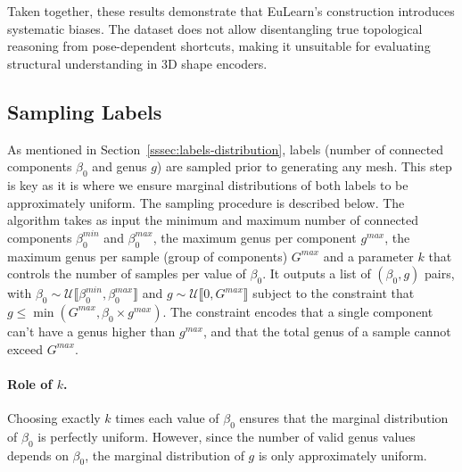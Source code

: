 Taken together, these results demonstrate that EuLearn’s construction introduces systematic biases. The dataset does not allow disentangling true topological reasoning from pose-dependent shortcuts, making it unsuitable for evaluating structural understanding in 3D shape encoders.

\subsection{Sampling Labels}
\label{ssec:suppl_sampling_labels}

As mentioned in Section~\ref{sssec:labels-distribution}, labels (number of connected components $\beta_0$ and genus $g$) are sampled prior to generating any mesh. This step is key as it is where we ensure marginal distributions of both labels to be approximately uniform. The sampling procedure is described below. The algorithm takes as input the minimum and maximum number of connected components $\beta_0^{min}$ and $\beta_0^{max}$, the maximum genus per component $g^{max}$, the maximum genus per sample (group of components) $G^{max}$ and a parameter $k$ that controls the number of samples per value of $\beta_0$. It outputs a list of $(\beta_0, g)$ pairs, with $\beta_0\sim\mathcal{U}\llbracket \beta_0^{min}, \beta_0^{max} \rrbracket$ and $g\sim\mathcal{U}\llbracket 0, G^{max} \rrbracket$ subject to the constraint that $g \leq \min(G^{max}, \beta_0 \times g^{max})$. The constraint encodes that a single component can't have a genus higher than $g^{max}$, and that the total genus of a sample cannot exceed $G^{max}$. 

\paragraph{Role of $k$.} 
Choosing exactly $k$ times each value of $\beta_0$ ensures that the marginal distribution of $\beta_0$ is perfectly uniform. However, since the number of valid genus values depends on $\beta_0$, the marginal distribution of $g$ is only approximately uniform.


